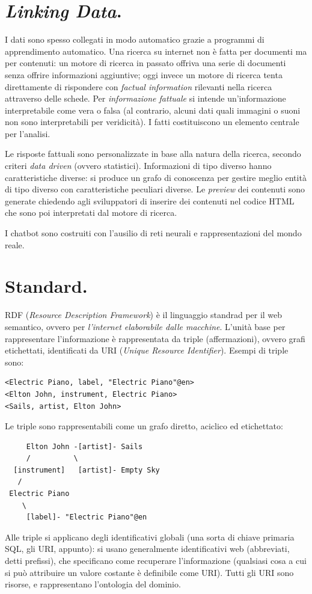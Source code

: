 \documentclass[11pt]{article}
\begin{document}
\section{\textit{Linking Data}.}
I dati sono spesso collegati in modo automatico grazie a programmi di apprendimento automatico.
Una ricerca su internet non è fatta per documenti ma per contenuti: un motore di ricerca in passato offriva una serie di documenti senza offrire informazioni aggiuntive; oggi invece un motore di ricerca tenta direttamente di rispondere con \textit{factual information} rilevanti nella ricerca attraverso delle schede.
Per \textit{informazione fattuale} si intende un'informazione interpretabile come vera o falsa (al contrario, alcuni dati quali immagini o suoni non sono interpretabili per veridicità).
I fatti costituiscono un elemento centrale per l'analisi.

Le risposte fattuali sono personalizzate in base alla natura della ricerca, secondo criteri \textit{data driven} (ovvero statistici).
Informazioni di tipo diverso hanno caratteristiche diverse: si produce un grafo di conoscenza per gestire meglio entità di tipo diverso con caratteristiche peculiari diverse.
Le \textit{preview} dei contenuti sono generate chiedendo agli sviluppatori di inserire dei contenuti nel codice HTML che sono poi interpretati dal motore di ricerca.

I chatbot sono costruiti con l'ausilio di reti neurali e rappresentazioni del mondo reale.


\section{Standard.}
RDF (\textit{Resource Description Framework}) è il linguaggio standrad per il web semantico, ovvero per \textit{l'internet elaborabile dalle macchine}.
L'unità base per rappresentare l'informazione è rappresentata da triple (affermazioni), ovvero grafi etichettati, identificati da URI (\textit{Unique Resource Identifier}).
Esempi di triple sono:
\begin{verbatim}
<Electric Piano, label, "Electric Piano"@en>
<Elton John, instrument, Electric Piano>
<Sails, artist, Elton John>
\end{verbatim}
Le triple sono rappresentabili come un grafo diretto, aciclico ed etichettato:
\begin{verbatim}
     Elton John -[artist]- Sails
     /          \
  [instrument]   [artist]- Empty Sky
   /
 Electric Piano 
    \
     [label]- "Electric Piano"@en
\end{verbatim}
Alle triple si applicano degli identificativi globali (una sorta di chiave primaria SQL, gli URI, appunto): si usano generalmente identificativi web (abbreviati, detti prefissi), che specificano come recuperare l'informazione (qualsiasi cosa a cui si può attribuire un valore costante è definibile come URI).
Tutti gli URI sono risorse, e rappresentano l'ontologia del dominio.
\end{document}
